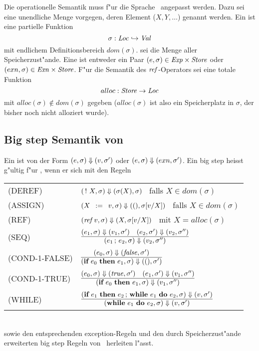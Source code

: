Die operationelle Semantik muss f"ur die Sprache \LFOUR\ angepasst werden. Dazu sei eine unendliche Menge \notation{$\Loc$} vorgegen,
deren Element ($X, Y, \ldots$)   genannt werden. Ein 
 ist eine partielle Funktion
\[
  \sigma: {\text{\it Loc\/}} \hookrightarrow {\text{\it Val\/}}
\]
mit endlichem Definitionsbereich $dom(\sigma)$.
 sei die Menge aller Speicherzust"ande. Eine  ist entweder ein Paar
$(e,\sigma) \in {\text{\it Exp\/}} \times {\text{\it Store\/}}$ oder $(exn, \sigma) \in {\text{\it Exn\/}} \times {\text{\it Store\/}}$. F"ur die Semantik des
${\text{\it ref\/}}$-Operators sei eine totale Funktion
\[
  alloc: {\text{\it Store\/}} \to {\text{\it Loc\/}}
\]
mit $alloc(\sigma) \not\in dom(\sigma)$ gegeben ($alloc(\sigma)$ ist also ein Speicherplatz in $\sigma$,
der bisher noch nicht alloziert wurde).


\subsection{Big step Semantik von \LFOUR}

Ein  ist von der Form $(e,\sigma) \Downarrow (v,\sigma')$ oder $(e,\sigma) \Downarrow (exn,\sigma')$. Ein big step
heisst g"ultig f"ur \LFOUR, wenn er sich mit den Regeln\\[5mm]
  \begin{tabular}{ll}
    \mbox{(DEREF)}        & $(\,!\,\,X, \sigma) \Downarrow (\sigma(X), \sigma)$   \ falls $X \in dom(\sigma)$ \\[3mm]
    \mbox{(ASSIGN)}       & $(X\,\ :=\ \,v, \sigma) \Downarrow ((), \sigma[v/X])$ \ falls $X \in dom(\sigma)$ \\[3mm]
    \mbox{(REF)}          & $({\text{\it ref\/}}\,v, \sigma) \Downarrow (X, \sigma[v/X])$        \ mit $X = alloc(\sigma)$ \\[3mm]
    \mbox{(SEQ)}          & $\regel{(e_1,\sigma) \eval (v_1,\sigma') \quad (e_2,\sigma') \eval (v_2,\sigma'')}
                                   {(e_1\,;\,e_2,\sigma) \eval (v_2,\sigma'')}$ \\[5mm]
    \mbox{(COND-1-FALSE)} & $\regel{(e_0,\sigma) \eval (\false,\sigma')}
                                   {(\bift{e_0}{e_1},\sigma) \eval ((), \sigma')}$ \\[5mm]
    \mbox{(COND-1-TRUE)}  & $\regel{(e_0,\sigma) \eval (\true,\sigma') \quad (e_1,\sigma') \eval (v_1,\sigma'')}
                                   {(\bift{e_0}{e_1},\sigma) \eval (v_1,\sigma'')}$ \\[5mm]
    \mbox{(WHILE)}        & $\regel{(\bift{e_1}{e_2\,;\,\bwd{e_1}{e_2}}, \sigma) \eval (v,\sigma')}
                                   {(\bwd{e_1}{e_2}, \sigma) \eval (v,\sigma')}$
  \end{tabular}\\[7mm]
sowie den entsprechenden exception-Regeln und den durch Speicherzust"ande erweiterten big step Regeln von \LTHREE\ 
herleiten l"asst.


